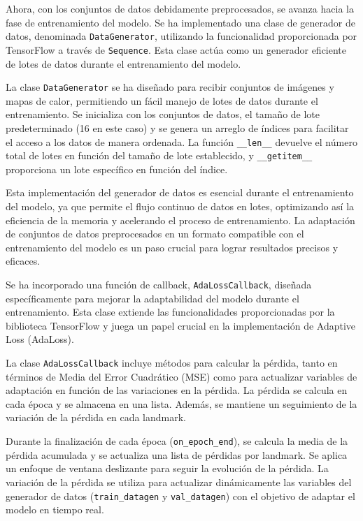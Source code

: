\documentclass[runningheads]{llncs}
\begin{document}
Ahora, con los conjuntos de datos debidamente preprocesados, se avanza hacia la fase de entrenamiento del modelo. Se ha implementado una clase de generador de datos, denominada \verb|DataGenerator|, utilizando la funcionalidad proporcionada por TensorFlow a través de \verb|Sequence|. Esta clase actúa como un generador eficiente de lotes de datos durante el entrenamiento del modelo.

La clase \verb|DataGenerator| se ha diseñado para recibir conjuntos de imágenes y mapas de calor, permitiendo un fácil manejo de lotes de datos durante el entrenamiento. Se inicializa con los conjuntos de datos, el tamaño de lote predeterminado (16 en este caso) y se genera un arreglo de índices para facilitar el acceso a los datos de manera ordenada. La función \verb|__len__| devuelve el número total de lotes en función del tamaño de lote establecido, y \verb|__getitem__| proporciona un lote específico en función del índice. 

Esta implementación del generador de datos es esencial durante el entrenamiento del modelo, ya que permite el flujo continuo de datos en lotes, optimizando así la eficiencia de la memoria y acelerando el proceso de entrenamiento. La adaptación de conjuntos de datos preprocesados en un formato compatible con el entrenamiento del modelo es un paso crucial para lograr resultados precisos y eficaces.

Se ha incorporado una función de callback, \verb|AdaLossCallback|, diseñada específicamente para mejorar la adaptabilidad del modelo durante el entrenamiento. Esta clase extiende las funcionalidades proporcionadas por la biblioteca TensorFlow y juega un papel crucial en la implementación de Adaptive Loss (AdaLoss).

La clase \verb|AdaLossCallback| incluye métodos para calcular la pérdida, tanto en términos de Media del Error Cuadrático (MSE) como para actualizar variables de adaptación en función de las variaciones en la pérdida. La pérdida se calcula en cada época y se almacena en una lista. Además, se mantiene un seguimiento de la variación de la pérdida en cada landmark.

Durante la finalización de cada época (\verb|on_epoch_end|), se calcula la media de la pérdida acumulada y se actualiza una lista de pérdidas por landmark. Se aplica un enfoque de ventana deslizante para seguir la evolución de la pérdida. La variación de la pérdida se utiliza para actualizar dinámicamente las variables del generador de datos (\verb|train_datagen| y \verb|val_datagen|) con el objetivo de adaptar el modelo en tiempo real.
\end{document}
